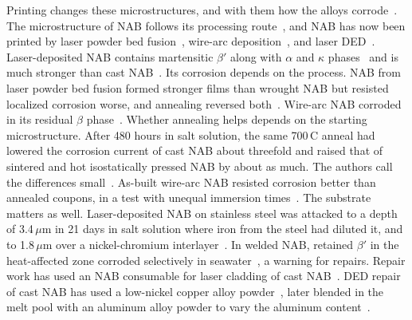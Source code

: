 \documentclass[12pt,letterpaper]{article}
\begin{document}
Printing changes these microstructures, and with them how the alloys
corrode~\cite{sander2018}. The microstructure of NAB follows its processing
route~\cite{orzolek2022}, and NAB has now been printed by laser
powder bed fusion~\cite{murray2020}, wire-arc deposition~\cite{ding2016,dharmendra2019},
and laser DED~\cite{liu2021,li2021}. Laser-deposited NAB contains martensitic
$\beta'$ along with $\alpha$ and $\kappa$ phases~\cite{liu2021,li2021} and
is much stronger than cast NAB~\cite{li2021}. Its corrosion depends on the
process. NAB from laser powder bed fusion formed stronger films than wrought
NAB but resisted localized corrosion worse, and annealing reversed
both~\cite{morshed2024}. Wire-arc NAB corroded in its residual $\beta$
phase~\cite{cai2023}. Whether annealing helps depends on the starting
microstructure. After 480 hours in salt solution, the same 700\,\textdegree{}C
anneal had lowered the corrosion current of cast NAB about threefold and raised that of sintered and hot isostatically pressed NAB by about as much.
The authors call the differences small~\cite{fayanas2025}.
As-built wire-arc NAB
resisted corrosion better than annealed coupons, in a test with unequal
immersion times~\cite{shahriari2023}. The substrate matters as well.
Laser-deposited NAB on stainless steel was attacked to a depth of
3.4\,$\mu$m in 21 days in salt solution where iron from the steel had diluted
it, and to 1.8\,$\mu$m over a nickel-chromium interlayer~\cite{zhao2022}. In
welded NAB, retained $\beta'$ in the heat-affected zone corroded selectively
in seawater~\cite{dobson2024}, a warning for repairs. Repair work has used an
NAB consumable for laser cladding of cast NAB~\cite{hyatt1998}. DED repair of
cast NAB has used a low-nickel copper alloy powder~\cite{yao2022a,yao2022b},
later blended in the melt pool with an aluminum alloy powder to vary the
aluminum content~\cite{yao2025}.
\end{document}
